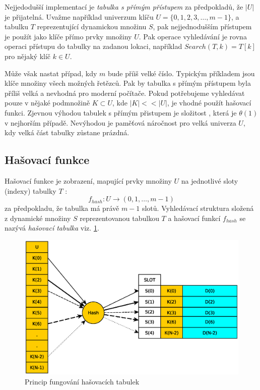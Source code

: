 Nejjedodušší implementací je \textit{tabulka s přímým přístupem} za
předpokladů, že $|U|$ je přijatelná. Uvažme například univerzum
klíču $U = \{0,1,2,3,\ldots,m-1\}$, a tabulku $T$ reprezentující
dynamickou množinu $S$, pak nejjednodušším přístupem je použít jako
klíče přímo prvky množiny $U$. Pak operace vyhledávání je rovna operaci
přístupu do tabulky na zadanou lokaci, například $Search(T,k) = T[k]$
pro nějaký klíč $k \in U$.

Může však nastat případ, kdy $m$ bude příiš velké číslo. Typickým příkladem
jsou klíče množiny všech možných řetězců. Pak by tabulka s přímým přístupem
byla příliš velká a nevhodná pro moderní počítače. Pokud potřebujeme 
vyhledávat pouze v nějaké podmnožině $K \subset U$, kde $|K| << |U|$, je 
vhodné použít hašovací funkci. Zjevnou výhodou tabulek s přímým přistupem je složitost
, která je $\theta (1)$ v nejhorším případě. Nevýhodou je paměťová náročnost
pro velká univerza $U$, kdy velká část tabulky zůstane prázdná.

\subsection{Hašovací funkce}
Hašovací funkce je zobrazení, mapující prvky množiny $U$ na jednotlivé 
sloty (indexy) tabulky $T$ :
$$ f_{hash} : U \to (0,1,\ldots,m-1)$$
za předpokladu, že tabulka má právě $m-1$ slotů. Vyhledávací struktura 
složená z dynamické množiny $S$ reprezentovanou tabulkou $T$ a hašovací 
funkcí $f_{hash}$ se nazývá \textit{hašovací tabulka} 
viz. \ref{fig:hash_table_example}.

\begin{figure}[!ht]
	\centering
	\includegraphics[scale=0.6]{fig/hash_table_example}	
	\caption{Princip fungování hašovacích tabulek}
	\label{fig:hash_table_example}
\end{figure}
 
